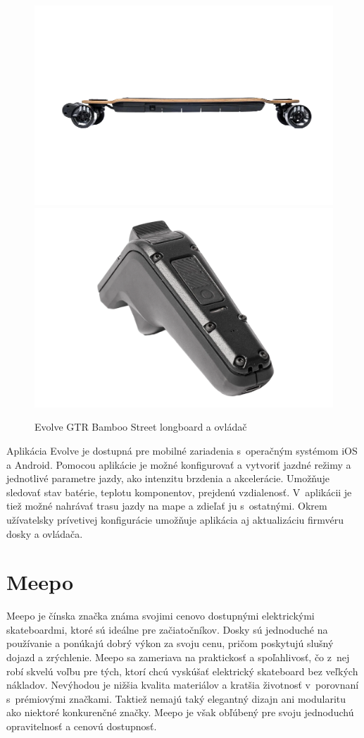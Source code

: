 \begin{figure}[h]
    \centering
    \includegraphics[width=0.48\linewidth]{obrazky-figures/brand-reviews/evolve-longboard.png}\hfill
    \includegraphics[width=0.48\linewidth]{obrazky-figures/brand-reviews/evolve-controller.png}
    \caption{Evolve GTR Bamboo Street longboard a ovládač\cite{Evolve}}\label{fig:evolve}
\end{figure}

Aplikácia Evolve je dostupná pre mobilné zariadenia s~operačným systémom iOS a Android.
Pomocou aplikácie je možné konfigurovať a vytvoriť jazdné režimy a jednotlivé parametre jazdy, ako intenzitu brzdenia a akcelerácie.
Umožňuje sledovať stav batérie, teplotu komponentov, prejdenú vzdialenosť.
V~aplikácii je tiež možné nahrávať trasu jazdy na mape a zdieľať ju s~ostatnými.
Okrem užívatelsky prívetivej konfigurácie umožňuje aplikácia aj aktualizáciu firmvéru dosky a ovládača.\cite{Evolve}

\section{Meepo}
Meepo je čínska značka známa svojimi cenovo dostupnými elektrickými skateboardmi, ktoré sú ideálne pre začiatočníkov. 
Dosky sú jednoduché na používanie a ponúkajú dobrý výkon za svoju cenu, pričom poskytujú slušný dojazd a zrýchlenie.
Meepo sa zameriava na praktickosť a spoľahlivosť, čo z~nej robí skvelú voľbu pre tých, ktorí chcú vyskúšať elektrický skateboard bez veľkých nákladov. 
Nevýhodou je nižšia kvalita materiálov a kratšia životnosť v~porovnaní s~prémiovými značkami. 
Taktiež nemajú taký elegantný dizajn ani modularitu ako niektoré konkurenčné značky. 
Meepo je však obľúbený pre svoju jednoduchú opravitelnosť a cenovú dostupnosť.

